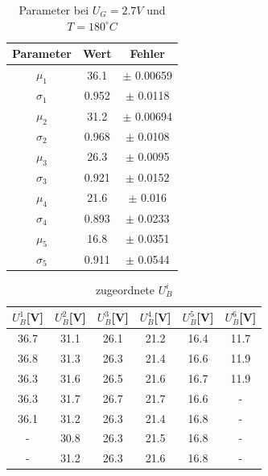 \documentclass{article}
\begin{document}
\begin{multicols}{2}
\begin{table}[H]
  \centering
  \begin{tabular}{|c|c|c|}
      \hline
      Parameter & Wert & Fehler  \\ \hline
      $\mu_1$ & 36.1 & $\pm$ 0.00659 \\ \hline
      $\sigma_1$ & 0.952 & $\pm$ 0.0118 \\ \hline
      $\mu_2$ & 31.2 & $\pm$ 0.00694 \\ \hline
      $\sigma_2$ & 0.968 & $\pm$ 0.0108 \\ \hline
      $\mu_3$ & 26.3 & $\pm$ 0.0095 \\ \hline
      $\sigma_3$ & 0.921 & $\pm$ 0.0152 \\ \hline
      $\mu_4$ & 21.6 & $\pm$ 0.016 \\ \hline
      $\sigma_4$ & 0.893 & $\pm$ 0.0233 \\ \hline
      $\mu_5$ & 16.8 & $\pm$ 0.0351 \\ \hline
      $\sigma_5$ & 0.911 & $\pm$ 0.0544 \\ \hline
  \end{tabular}
  \caption{Parameter bei $U_G=2.7V$ und $T=180^\circ C$}
  \label{tab:data_no_height_8}
\end{table}

\begin{table}[H]
  \centering
  \begin{tabular}{cccccc} 
      \hline
      $U^1_B$[V] & $U^2_B$[V] & $U^3_B$[V] & $U^4_B$[V] & $U^5_B$[V] & $U^6_B$[V] \\ \hline
      36.7 & 31.1 & 26.1 & 21.2 & 16.4 & 11.7 \\ \hline
      36.8 & 31.3 & 26.3 & 21.4 & 16.6 & 11.9 \\ \hline
      36.3 & 31.6 & 26.5 & 21.6 & 16.7 & 11.9 \\ \hline
      36.3 & 31.7 & 26.7 & 21.7 & 16.6 & - \\ \hline
      36.1 & 31.2 & 26.3 & 21.4 & 16.8 & - \\ \hline
      - & 30.8 & 26.3 & 21.5 & 16.8 & - \\ \hline
      - & 31.2 & 26.3 & 21.6 & 16.8 & - \\ \hline
  \end{tabular}
  \caption{zugeordnete $U^i_B$}
  \label{tab:measurements1}
\end{table}


\end{multicols}
\end{document}
